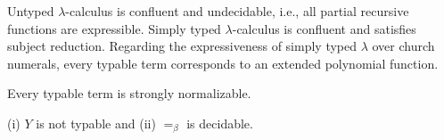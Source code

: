 
\begin{remark}
    Untyped $\lambda$-calculus is confluent and undecidable, i.e., all partial recursive functions are expressible. 
    Simply typed $\lambda$-calculus is confluent and satisfies subject reduction.
    Regarding the expressiveness of simply typed $\lambda$ over church numerals, every typable term corresponds to an extended polynomial function.
\end{remark}

\begin{theorem}
	Every typable term is strongly normalizable.
\end{theorem}

\begin{corollary}
    (i) $Y$ is not typable and  (ii) $=_\beta$ is decidable.
\end{corollary}

